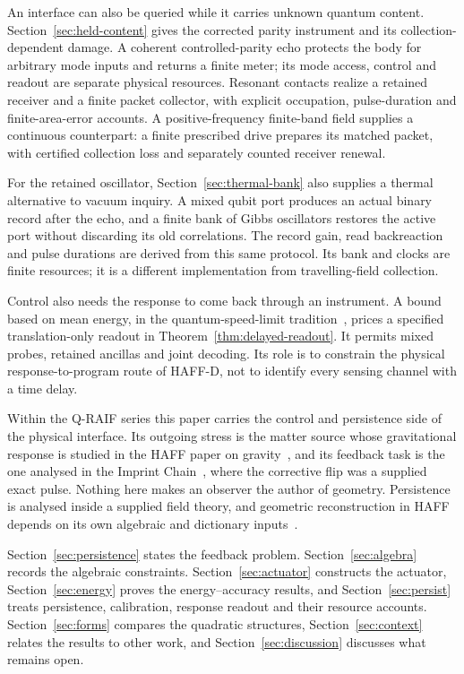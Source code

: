 \documentclass[aps,pre,onecolumn,superscriptaddress,floatfix,longbibliography]{revtex4-2}
\begin{document}
An interface can also be queried while it carries unknown quantum content.
Section~\ref{sec:held-content} gives the corrected parity instrument and its
collection-dependent damage. A coherent controlled-parity echo protects the
body for arbitrary mode inputs and returns a finite meter; its mode access,
control and readout are separate physical resources. Resonant contacts realize
a retained receiver and a finite packet collector, with explicit occupation,
pulse-duration and finite-area-error accounts. A positive-frequency finite-band
field supplies a continuous counterpart: a finite prescribed drive prepares
its matched packet, with certified collection loss and separately counted
receiver renewal.

For the retained oscillator, Section~\ref{sec:thermal-bank} also supplies
a thermal alternative to vacuum inquiry. A mixed qubit port produces an
actual binary record after the echo, and a finite bank of Gibbs oscillators
restores the active port without discarding its old correlations. The record
gain, read backreaction and pulse durations are derived from this same
protocol. Its bank and clocks are finite resources; it is a different
implementation from travelling-field collection.

Control also needs the response to come back through an instrument. A bound based
on mean energy, in the quantum-speed-limit tradition~\cite{MargolusLevitin1998},
prices a specified translation-only readout in Theorem~\ref{thm:delayed-readout}.
It permits mixed probes, retained ancillas and joint decoding. Its role is to
constrain the physical response-to-program route of HAFF-D, not to identify
every sensing channel with a time delay.

Within the Q-RAIF series this paper carries the control and persistence side of the physical interface. Its outgoing stress is the matter source whose gravitational response is studied in the HAFF paper on gravity~\cite{Liu2026HAFFD}, and its feedback task is the one analysed in the Imprint Chain~\cite{Liu2026Chain}, where the corrective flip was a supplied exact pulse. Nothing here makes an observer the author of geometry. Persistence is analysed inside a supplied field theory, and geometric reconstruction in HAFF depends on its own algebraic and dictionary inputs~\cite{Liu2026PaperB}.

Section~\ref{sec:persistence} states the feedback problem. Section~\ref{sec:algebra} records the algebraic constraints. Section~\ref{sec:actuator} constructs the actuator, Section~\ref{sec:energy} proves the energy--accuracy results, and Section~\ref{sec:persist} treats persistence, calibration, response readout and their resource accounts. Section~\ref{sec:forms} compares the quadratic structures, Section~\ref{sec:context} relates the results to other work, and Section~\ref{sec:discussion} discusses what remains open.
\end{document}

